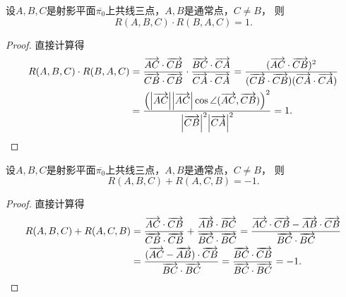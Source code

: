 \begin{property}
设\(A,B,C\)是射影平面\(\overline{\pi_0}\)上共线三点，\(A,B\)是通常点，\(C \neq B\)，
则\begin{equation*}
	R(A,B,C) \cdot R(B,A,C) = 1.
\end{equation*}
\begin{proof}
直接计算得\begin{align*}
	R(A,B,C) \cdot R(B,A,C)
	&= \frac{
		\overrightarrow{AC}\cdot\overrightarrow{CB}
	}{
		\overrightarrow{CB}\cdot\overrightarrow{CB}
	}
	\cdot \frac{
		\overrightarrow{BC}\cdot\overrightarrow{CA}
	}{
		\overrightarrow{CA}\cdot\overrightarrow{CA}
	}
	= \frac{
		(\overrightarrow{AC}\cdot\overrightarrow{CB})^2
	}{
		(\overrightarrow{CB}\cdot\overrightarrow{CB})
		(\overrightarrow{CA}\cdot\overrightarrow{CA})
	} \\
	&= \frac{
		\left( \abs{\overrightarrow{AC}} \abs{\overrightarrow{AC}} \cos\angle(\overrightarrow{AC},\overrightarrow{CB}) \right)^2
	}{
		\abs{\overrightarrow{CB}}^2 \abs{\overrightarrow{CA}}^2
	}
	= 1.
	\qedhere
\end{align*}
\end{proof}
\end{property}

\begin{property}
设\(A,B,C\)是射影平面\(\overline{\pi_0}\)上共线三点，\(A,B\)是通常点，\(C \neq B\)，
则\begin{equation*}
	R(A,B,C) + R(A,C,B) = -1.
\end{equation*}
\begin{proof}
直接计算得\begin{align*}
	R(A,B,C) + R(A,C,B)
	&= \frac{
		\overrightarrow{AC}\cdot\overrightarrow{CB}
	}{
		\overrightarrow{CB}\cdot\overrightarrow{CB}
	}
	+ \frac{
		\overrightarrow{AB}\cdot\overrightarrow{BC}
	}{
		\overrightarrow{BC}\cdot\overrightarrow{BC}
	}
	= \frac{
		\overrightarrow{AC}\cdot\overrightarrow{CB}
		- \overrightarrow{AB}\cdot\overrightarrow{CB}
	}{
		\overrightarrow{BC}\cdot\overrightarrow{BC}
	} \\
	&= \frac{
		(\overrightarrow{AC} - \overrightarrow{AB})\cdot\overrightarrow{CB}
	}{
		\overrightarrow{BC}\cdot\overrightarrow{BC}
	}
	= \frac{
		\overrightarrow{BC}\cdot\overrightarrow{CB}
	}{
		\overrightarrow{BC}\cdot\overrightarrow{BC}
	}
	= -1.
	\qedhere
\end{align*}
\end{proof}
\end{property}

